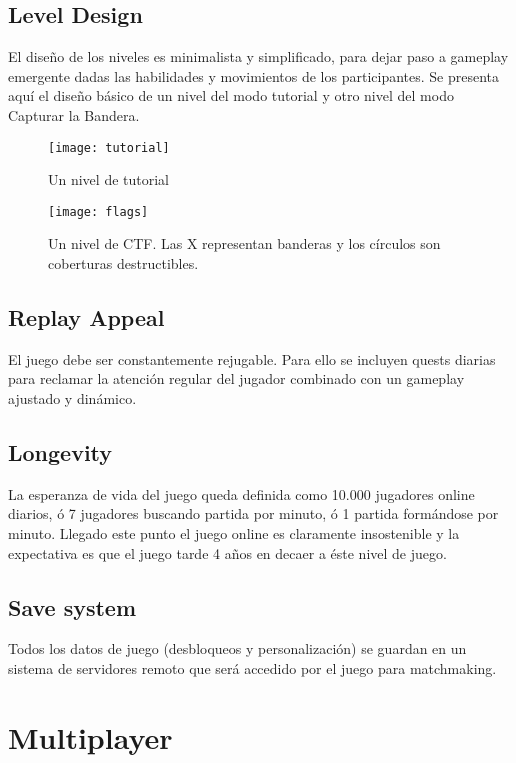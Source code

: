 \documentclass[12pt]{article}
\begin{document}
\subsection{Level Design}

El diseño de los niveles es minimalista y simplificado, para dejar paso a gameplay emergente dadas las habilidades y movimientos de los participantes. Se presenta aquí el diseño básico de un nivel del modo tutorial y otro nivel del modo Capturar la Bandera.

\begin{figure}[H]
    \centering
    \texttt{[image: tutorial]}
    \caption{Un nivel de tutorial}
\end{figure}


\begin{figure}[H]
    \centering
    \texttt{[image: flags]}
    \caption{Un nivel de CTF. Las X representan banderas y los círculos son coberturas destructibles.}
\end{figure}

\subsection{Replay Appeal}

El juego debe ser constantemente rejugable. Para ello se incluyen quests diarias para reclamar la atención regular del jugador combinado con un gameplay ajustado y dinámico.

\subsection{Longevity}

La esperanza de vida del juego queda definida como 10.000 jugadores online diarios, ó 7 jugadores buscando partida por minuto, ó 1 partida formándose por minuto. Llegado este punto el juego online es claramente insostenible y la expectativa es que el juego tarde 4 años en decaer a éste nivel de juego.

\subsection{Save system}

Todos los datos de juego (desbloqueos y personalización) se guardan en un sistema de servidores remoto que será accedido por el juego para matchmaking.

\newpage

\section{Multiplayer}
\end{document}

